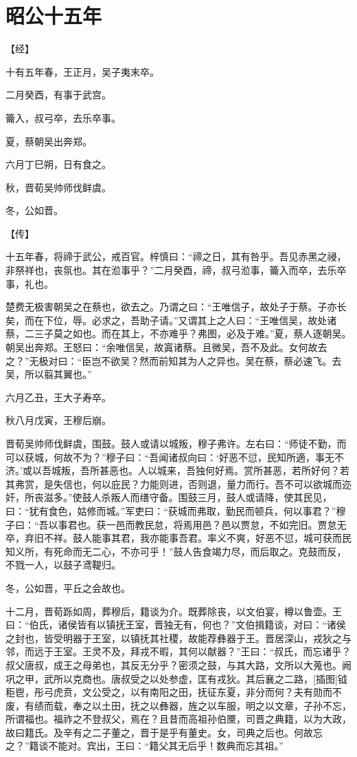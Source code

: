 \documentclass[a4paper,12pt,UTF8,twoside]{ctexbook}
\begin{document}
\chapter{昭公十五年}



【经】

十有五年春，王正月，吴子夷末卒。

二月癸酉，有事于武宫。

籥入，叔弓卒，去乐卒事。

夏，蔡朝吴出奔郑。

六月丁巳朔，日有食之。

秋，晋荀吴帅师伐鲜虞。

冬，公如晋。

【传】

十五年春，将禘于武公，戒百官。梓慎曰：“禘之日，其有咎乎。吾见赤黑之祲，非祭祥也，丧氛也。其在涖事乎？”二月癸酉，禘，叔弓涖事，籥入而卒，去乐卒事，礼也。

楚费无极害朝吴之在蔡也，欲去之。乃谓之曰：“王唯信子，故处子于蔡。子亦长矣，而在下位，辱。必求之，吾助子请。”又谓其上之人曰：“王唯信吴，故处诸蔡，二三子莫之如也。而在其上，不亦难乎？弗图，必及于难。”夏，蔡人逐朝吴。朝吴出奔郑。王怒曰：“余唯信吴，故寘诸蔡。且微吴，吾不及此。女何故去之？”无极对曰：“臣岂不欲吴？然而前知其为人之异也。吴在蔡，蔡必速飞。去吴，所以翦其翼也。”

六月乙丑，王大子寿卒。

秋八月戊寅，王穆后崩。

晋荀吴帅师伐鲜虞，围鼓。鼓人或请以城叛，穆子弗许。左右曰：“师徒不勤，而可以获城，何故不为？”穆子曰：“吾闻诸叔向曰：‘好恶不愆，民知所適，事无不济。’或以吾城叛，吾所甚恶也。人以城来，吾独何好焉。赏所甚恶，若所好何？若其弗赏，是失信也，何以庇民？力能则进，否则退，量力而行。吾不可以欲城而迩奸，所丧滋多。”使鼓人杀叛人而缮守备。围鼓三月，鼓人或请降，使其民见，曰：“犹有食色，姑修而城。”军吏曰：“获城而弗取，勤民而顿兵，何以事君？”穆子曰：“吾以事君也。获一邑而教民怠，将焉用邑？邑以贾怠，不如完旧。贾怠无卒，弃旧不祥。鼓人能事其君，我亦能事吾君。率义不爽，好恶不愆，城可获而民知义所，有死命而无二心，不亦可乎！”鼓人告食竭力尽，而后取之。克鼓而反，不戮一人，以鼓子鸢鞮归。

冬，公如晋，平丘之会故也。

十二月，晋荀跞如周，葬穆后，籍谈为介。既葬除丧，以文伯宴，樽以鲁壶。王曰：“伯氏，诸侯皆有以镇抚王室，晋独无有，何也？”文伯揖籍谈，对曰：“诸侯之封也，皆受明器于王室，以镇抚其社稷，故能荐彝器于王。晋居深山，戎狄之与邻，而远于王室。王灵不及，拜戎不暇，其何以献器？”王曰：“叔氏，而忘诸乎？叔父唐叔，成王之母弟也，其反无分乎？密须之鼓，与其大路，文所以大蒐也。阙巩之甲，武所以克商也。唐叔受之以处参虚，匡有戎狄。其后襄之二路，[插图]钺秬鬯，彤弓虎贲，文公受之，以有南阳之田，抚征东夏，非分而何？夫有勋而不废，有绩而载，奉之以土田，抚之以彝器，旌之以车服，明之以文章，子孙不忘，所谓福也。福祚之不登叔父，焉在？且昔而高祖孙伯黡，司晋之典籍，以为大政，故曰籍氏。及辛有之二子董之，晋于是乎有董史。女，司典之后也。何故忘之？”籍谈不能对。宾出，王曰：“籍父其无后乎！数典而忘其祖。”
\end{document}

